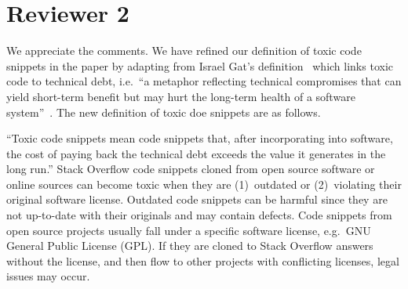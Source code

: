 \documentclass[a4paper,twoside,10pt]{reviewresponse}
\begin{document}
\section{Reviewer 2}


We appreciate the comments. We have refined our definition of toxic code snippets in the paper by adapting from Israel Gat's definition~\citep{toxiccode} which links toxic code to technical debt, i.e.~``a metaphor reflecting technical compromises that can yield short-term benefit but may hurt the long-term health of a software system''~\citep{Li2015}. The new definition of toxic doe snippets are as follows.

``Toxic code snippets mean code snippets that, after incorporating into software,
the cost of paying back the technical debt exceeds the value it generates in the long run.'' 
Stack Overflow code snippets
cloned from open source software or online sources can become toxic when they
are (1)~outdated or (2)~violating their original software
license. Outdated code snippets
can be harmful since they are not up-to-date with their originals and may
contain defects. Code snippets from open source projects usually fall under a
specific software license, e.g.\ GNU General Public License (GPL). If they are
cloned to Stack Overflow answers without the license, and then flow to other projects
with conflicting licenses, legal issues may occur.
 
\end{document}

